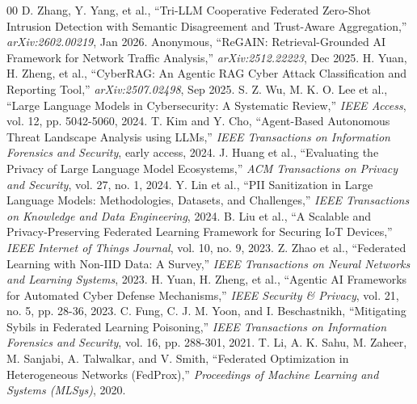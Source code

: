 \documentclass[conference]{IEEEtran}
\begin{document}
\begin{thebibliography}{00}
 D. Zhang, Y. Yang, et al., ``Tri-LLM Cooperative Federated Zero-Shot Intrusion Detection with Semantic Disagreement and Trust-Aware Aggregation,'' \textit{arXiv:2602.00219}, Jan 2026.
 Anonymous, ``ReGAIN: Retrieval-Grounded AI Framework for Network Traffic Analysis,'' \textit{arXiv:2512.22223}, Dec 2025.
 H. Yuan, H. Zheng, et al., ``CyberRAG: An Agentic RAG Cyber Attack Classification and Reporting Tool,'' \textit{arXiv:2507.02498}, Sep 2025.
 S. Z. Wu, M. K. O. Lee et al., ``Large Language Models in Cybersecurity: A Systematic Review,'' \textit{IEEE Access}, vol. 12, pp. 5042-5060, 2024.
 T. Kim and Y. Cho, ``Agent-Based Autonomous Threat Landscape Analysis using LLMs,'' \textit{IEEE Transactions on Information Forensics and Security}, early access, 2024.
 J. Huang et al., ``Evaluating the Privacy of Large Language Model Ecosystems,'' \textit{ACM Transactions on Privacy and Security}, vol. 27, no. 1, 2024.
 Y. Lin et al., ``PII Sanitization in Large Language Models: Methodologies, Datasets, and Challenges,'' \textit{IEEE Transactions on Knowledge and Data Engineering}, 2024.
 B. Liu et al., ``A Scalable and Privacy-Preserving Federated Learning Framework for Securing IoT Devices,'' \textit{IEEE Internet of Things Journal}, vol. 10, no. 9, 2023.
 Z. Zhao et al., ``Federated Learning with Non-IID Data: A Survey,'' \textit{IEEE Transactions on Neural Networks and Learning Systems}, 2023.
 H. Yuan, H. Zheng, et al., ``Agentic AI Frameworks for Automated Cyber Defense Mechanisms,'' \textit{IEEE Security \& Privacy}, vol. 21, no. 5, pp. 28-36, 2023.
 C. Fung, C. J. M. Yoon, and I. Beschastnikh, ``Mitigating Sybils in Federated Learning Poisoning,'' \textit{IEEE Transactions on Information Forensics and Security}, vol. 16, pp. 288-301, 2021.
 T. Li, A. K. Sahu, M. Zaheer, M. Sanjabi, A. Talwalkar, and V. Smith, ``Federated Optimization in Heterogeneous Networks (FedProx),'' \textit{Proceedings of Machine Learning and Systems (MLSys)}, 2020.
\end{thebibliography}
\end{document}
